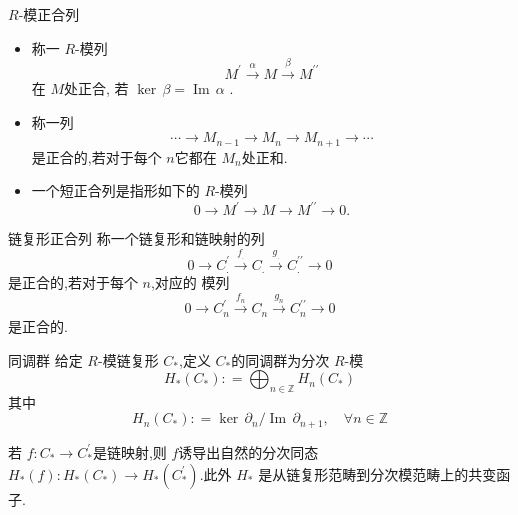 \documentclass[../../几何与拓扑.tex]{subfiles}
\begin{document}
\begin{definition}{\(  R  \)-模正合列 }
    \begin{itemize}
        \item 称一 \(  R  \)-模列 \[
            M^{\prime}\overset{\alpha}{\operatorname*{\longrightarrow}}M\overset{\beta}{\operatorname*{\longrightarrow}}M^{\prime\prime}
        \]在 \(  M  \)处正合, 若 \(  \operatorname{ker}\,\beta = \operatorname{Im}\,\alpha   \) .
        \item 称一列 \[
            \cdots\longrightarrow M_{n-1}\longrightarrow M_n\longrightarrow M_{n+1}\longrightarrow\cdots
        \]是正合的,若对于每个 \(  n  \)它都在 \(  M_{n}  \)处正和.
        \item 一个短正合列是指形如下的 \(  R  \)-模列 \[
            0\longrightarrow M^{\prime}\longrightarrow M\longrightarrow M^{\prime\prime}\longrightarrow0.
        \]   
    \end{itemize}
    
\end{definition}

\begin{definition}{链复形正合列}
    称一个链复形和链映射的列 \[
        0\longrightarrow C_{.}^{\prime}\xrightarrow{f_{.}}C_{.}\xrightarrow{g_{.}}C_{.}^{\prime\prime}\longrightarrow0
    \]是正合的,若对于每个 \(  n  \),对应的 模列 \[
        0\longrightarrow C_{n}^{\prime}\xrightarrow{f_{n}}C_{n}\xrightarrow{g_{n}}C_{n}^{\prime\prime}\longrightarrow0      
    \]是正合的.  
\end{definition}

\begin{definition}{同调群}
    给定 \(  R  \)-模链复形 \(  C_{*}  \),定义 \(  C_{*}  \)的同调群为分次 \(  R  \)-模 \[
    H_{*}\left( C_{*} \right): =   \bigoplus_{n\in \mathbb{Z} }H_{n}\left( C_{*} \right) 
    \]    其中 \[
    H_{n}\left( C_{*} \right) : =   \operatorname{ker}\,\partial _{n} / \operatorname{Im}\,\partial _{n+ 1},\quad \forall n\in \mathbb{Z} 
    \]
\end{definition}


\begin{proposition}
    若 \(  f: C_{*}\to C_{*}^{\prime}   \)是链映射,则 \(  f  \)诱导出自然的分次同态 \(  H_{*}\left( f \right): H_{*}\left( C_{*} \right)\to H_{*}\left( C_{*}^{\prime}  \right)     \).此外 \(  H_{*}  \) 是从链复形范畴到分次模范畴上的共变函子.
\end{proposition}
\end{document}
